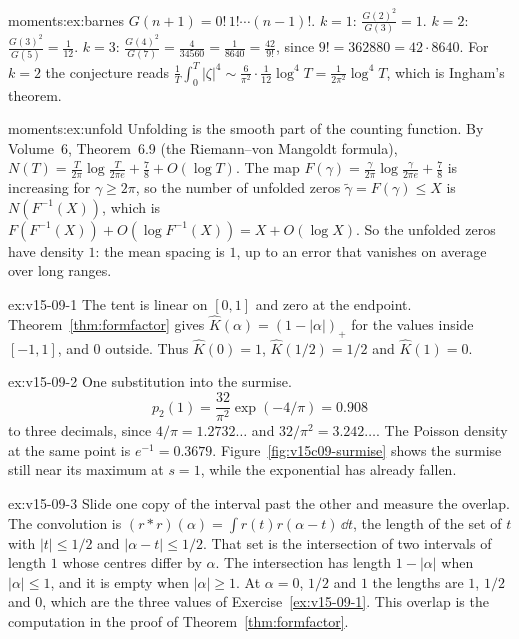 \begin{solution}{moments:ex:barnes}
\idea $G(n+1)=0!\,1!\cdots(n-1)!$.
\writeup $k=1$: $\frac{G(2)^2}{G(3)}=1$. $k=2$: $\frac{G(3)^2}{G(5)}=\frac1{12}$. $k=3$: $\frac{G(4)^2}{G(7)}=\frac4{34560}=\frac1{8640}=\frac{42}{9!}$, since $9!=362880=42\cdot8640$.
For $k=2$ the conjecture reads $\frac1T\int_0^T|\zeta|^4\sim\frac6{\pi^2}\cdot\frac1{12}\log^4T=\frac1{2\pi^2}\log^4T$, which is Ingham's theorem.
\end{solution}

\begin{solution}{moments:ex:unfold}
\idea Unfolding is the smooth part of the counting function.
\writeup By Volume~6, Theorem~6.9 (the Riemann--von Mangoldt formula), $N(T)=\frac T{2\pi}\log\frac T{2\pi e}+\frac78+O(\log T)$. The map $F(\gamma)=\frac\gamma{2\pi}\log\frac\gamma{2\pi e}+\frac78$ is increasing for $\gamma\ge2\pi$,
so the number of unfolded zeros $\tilde\gamma=F(\gamma)\le X$ is $N(F^{-1}(X))$, which is $F(F^{-1}(X))+O(\log F^{-1}(X))=X+O(\log X)$. So the unfolded zeros
have density $1$: the mean spacing is $1$, up to an error that vanishes on average over long ranges.
\end{solution}

\begin{solution}{ex:v15-09-1}
\idea The tent is linear on \([0,1]\) and zero at the endpoint.
\writeup Theorem~\ref{thm:formfactor} gives \(\hat K(\alpha)=(1-|\alpha|)_+\) for the values inside \([-1,1]\), and \(0\) outside. Thus \(\hat K(0)=1\), \(\hat K(1/2)=1/2\) and \(\hat K(1)=0\).
\end{solution}

\begin{solution}{ex:v15-09-2}
\idea One substitution into the surmise.
\writeup
\[
p_2(1)=\frac{32}{\pi^2}\exp(-4/\pi)=0.908
\]
to three decimals, since \(4/\pi=1.2732\ldots\) and \(32/\pi^2=3.242\ldots\). The Poisson density at the same point is \(e^{-1}=0.3679\). Figure~\ref{fig:v15c09-surmise} shows the surmise still near its maximum at \(s=1\), while the exponential has already fallen.
\end{solution}

\begin{solution}{ex:v15-09-3}
\idea Slide one copy of the interval past the other and measure the overlap.
\writeup The convolution is \((r*r)(\alpha)=\int r(t)r(\alpha-t)\,\dd t\), the length of the set of \(t\) with \(|t|\le1/2\) and \(|\alpha-t|\le1/2\). That set is the intersection of two intervals of length \(1\) whose centres differ by \(\alpha\). The intersection has length \(1-|\alpha|\) when \(|\alpha|\le1\), and it is empty when \(|\alpha|\ge1\). At \(\alpha=0\), \(1/2\) and \(1\) the lengths are \(1\), \(1/2\) and \(0\), which are the three values of Exercise~\ref{ex:v15-09-1}. This overlap is the computation in the proof of Theorem~\ref{thm:formfactor}.
\end{solution}

